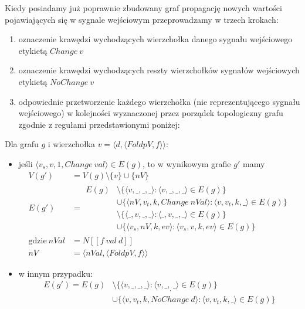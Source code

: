 \documentclass[11pt,leqno]{article}
\begin{document}
Kiedy posiadamy już poprawnie zbudowany graf propagację nowych wartości pojawiających się w sygnale wejściowym przeprowadzamy w trzech krokach:
\begin{enumerate}
\item oznaczenie krawędzi wychodzących wierzchołka danego sygnału wejściowego etykietą $Change\:v$
\item oznaczenie krawędzi wychodzących reszty wierzchołków sygnałów wejściowych etykietą $NoChange\:v$ 
\item odpowiednie przetworzenie każdego wierzchołka (nie reprezentującego sygnału wejściowego) w kolejności wyznaczonej przez porządek topologiczny grafu zgodnie z regułami przedstawionymi poniżej:
\end{enumerate}
\newpage
Dla grafu $g$ i wierzchołka $v = \langle d, \langle FoldpV,f \rangle \rangle$:
\begin{itemize}
\item jeśli $ \langle v_s , v, 1, Change\:val \rangle \in E(g) $, to w wynikowym grafie $g'$ mamy
\begin {align*}
V(g') &= V(g) \setminus \{ v \} \cup \{ nV \} \\
E(g') &= \begin{aligned} E(g) &\setminus \{ \langle v, \_, \_, \_ \rangle : \langle v, \_ , \_, \_ \rangle \in E(g) \} \\ 
&\cup \{ \langle nV, v_t, k, Change\: nVal \rangle : \langle v, v_t , k, \_ \rangle \in E(g) \} \\
&\setminus \{ \langle \_, v, \_, \_ \rangle : \langle \_, v, \_, \_ \rangle \in E(g) \} \\
&\cup \{ \langle v_s, nV, k, ev \rangle : \langle v_s, v, k, ev \rangle \in E(g) \} \end{aligned} \\
\text{gdzie} \: nVal &= N [\![f \: val \: d]\!] \\
nV &= \langle nVal , \langle FoldpV,f \rangle \rangle
\end{align*}
\item w innym przypadku:
\begin{align*}
E(g') = E(g) &\setminus \{ \langle v, \_, \_, \_ \rangle : \langle v, \_ , _, \_ \rangle \in E(g) \} \\ 
&\cup \{ \langle v, v_t, k, NoChange\: d \rangle : \langle v, v_t , k, \_ \rangle \in E(g) \}
\end{align*}
\end{itemize}
\end{document}
